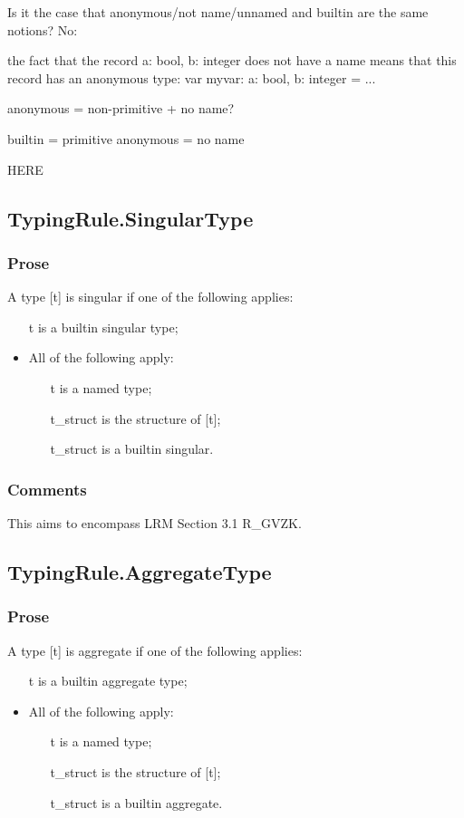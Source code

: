 \documentclass{book}
\begin{document}
    Is it the case that anonymous/not name/unnamed and builtin are the same notions?
    No:

    the fact that the record {a: bool, b: integer} does not have a name means that this record has an anonymous type:
    var myvar: {a: bool, b: integer} = ...

    anonymous = non-primitive + no name?

    builtin = primitive
    anonymous = no name

    HERE

\subsection{TypingRule.SingularType}

    \subsubsection{Prose}
    A type [t] is singular if one of the following applies:
    \begin{itemize}
    \item  [t] is a builtin singular type;
    \item  All of the following apply:
      \begin{itemize}
      \item  [t] is a named type;
      \item  [t\_struct] is the structure of [t];
      \item  [t\_struct] is a builtin singular.
      \end{itemize} 
    \end{itemize}

    \subsubsection{Comments}
    This aims to encompass LRM Section 3.1 R\_GVZK.

\subsection{TypingRule.AggregateType}

    \subsubsection{Prose}
    A type [t] is aggregate if one of the following applies:
    \begin{itemize}
    \item  [t] is a builtin aggregate type;
    \item  All of the following apply:
      \begin{itemize}
      \item  [t] is a named type;
      \item  [t\_struct] is the structure of [t];
      \item  [t\_struct] is a builtin aggregate. 
      \end{itemize}
    \end{itemize}
\end{document}

